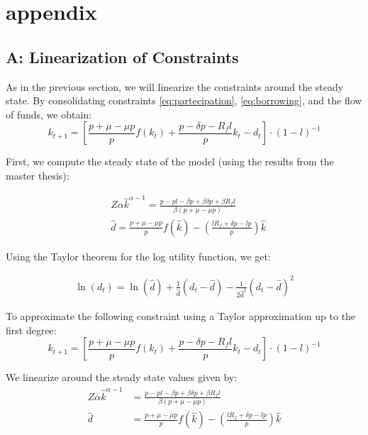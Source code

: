 \documentclass[12pt]{report}
\begin{document}
\appendix

\section{appendix}
\subsection{A: Linearization of Constraints}
\label{sec:linearization}
As in the previous section, we will linearize the constraints around the steady state. By consolidating constraints
\ref{eq:partecipation}, \ref{eq:borrowing}, and the flow of funds, we obtain: 
\begin{equation}
    k_{t+1} = \left[ \frac{p + \mu - \mu p}{p}f(k_{t}) + \frac{p - \delta p - R_f l}{p} k_{t} - d_t \right] \cdot \left(1-l\right)^{-1} \label{eq:flow}
\end{equation}

First, we compute the steady state of the model (using the results from the master thesis):

\begin{align}
    &Z \alpha \hat{k}^{\alpha-1} = \frac{p - p l - \beta p + \beta \delta p + \beta R_f l}{\beta \left(p + \mu - \mu p\right)} \label{eq:k_opt_path} \\
    &\widehat{d} =\frac{p+\mu-\mu p}{p}f(\hat{k})-\left(\frac{l R_f+\delta p - l p}{p}\right)\hat{k} \label{eq:div_opt_path}
\end{align}

Using the Taylor theorem for the log utility function, we get:

\begin{align*}
    \ln(d_t) = \ln(\hat{d}) + \frac{1}{\hat{d}}(d_t - \hat{d}) - \frac{1}{2\hat{d}^2}(d_t - \hat{d})^2
\end{align*}

To approximate the following constraint using a Taylor approximation up to the first degree:
\begin{equation}
    k_{t+1} = \left[ \frac{p + \mu - \mu p}{p} f(k_{t}) + \frac{p - \delta p - R_f l}{p} k_{t} - d_{t} \right] \cdot \left(1-l\right)^{-1} \label{eq:flow}
\end{equation}

We linearize around the steady state values given by:
\begin{align}
    Z \alpha \hat{k}^{\alpha-1} &= \frac{p - p l - \beta p + \beta \delta p + \beta R_f l}{\beta \left(p + \mu - \mu p\right)} \label{eq:k_opt_path} \\
    \hat{d} &= \frac{p + \mu - \mu p}{p} f(\hat{k}) - \left(\frac{l R_f + \delta p - l p}{p}\right) \hat{k} \label{eq:div_opt_path}
\end{align}
\end{document}
